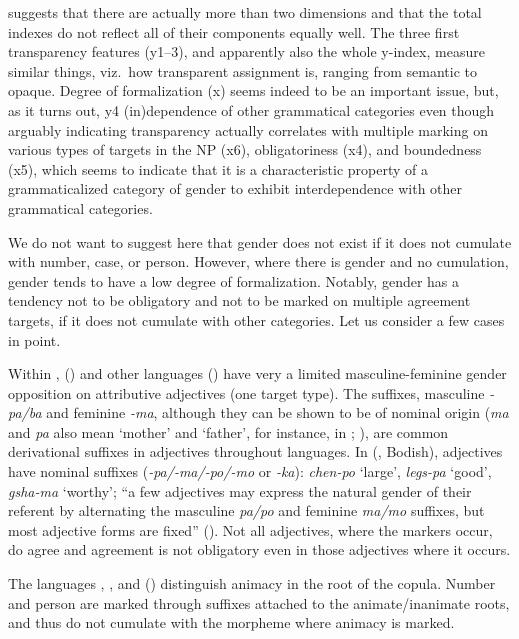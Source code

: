 \documentclass[output=collectionpaper]{langsci/langscibook}
\begin{document}
 suggests that there are actually more than two dimensions and that the total indexes do not reflect all of their components equally well. The three first transparency features (y1--3), and apparently also the whole y-index, measure similar things, viz.\ how transparent assignment is, ranging from semantic to opaque. Degree of formalization (x) seems indeed to be an important issue, but, as it turns out, y4 (in)dependence of other grammatical categories \textendash{} even though arguably indicating transparency \textendash{} actually correlates with multiple marking on various types of targets in the NP (x6), obligatoriness (x4), and boundedness (x5), which seems to indicate that it is a characteristic property of a grammaticalized category of gender to exhibit interdependence with other grammatical categories.

We do not want to suggest here that gender does not exist if it does not cumulate with number, case, or person. However, where there is gender and no cumulation, gender tends to have a low degree of formalization. Notably, gender has a tendency not to be obligatory and not to be marked on multiple agreement targets, if it does not cumulate with other categories. Let us consider a few cases in point.

Within ,  (\citealt[21]{Driem1987}) and other  languages (\citealt[508]{Ebert2003a}) have very a limited masculine-feminine gender opposition on attributive adjectives (one target type). The suffixes, masculine  \textit{-pa/ba} and feminine \textit{-ma}, although they can be shown to be of nominal origin (\textit{ma} and \textit{pa} also mean `mother' and `father', for instance, in ; \citealt[535]{Ebert2003b}), are common derivational suffixes in adjectives throughout  languages. In  (, Bodish), adjectives have nominal suffixes (\mbox{\textit{-pa/}}\mbox{\textit{-ma/}}\mbox{\textit{-po/}}\mbox{\textit{-mo}} or \textit{-ka}): \textit{chen-po} `large', \textit{legs-pa} `good', \textit{gsha-ma} `worthy'; ``a few adjectives may express the natural gender of their referent by alternating the masculine \textit{pa/po} and feminine \textit{ma/mo} suffixes, but most adjective forms are fixed'' (\citealt[373]{DeLancey2003}). Not all adjectives, where the markers occur, do agree and agreement is not obligatory even in those adjectives where it occurs.

The  languages , , and  () distinguish animacy in the root of the copula. Number and person are marked through suffixes attached to the animate/inanimate roots, and thus do not cumulate with the morpheme where animacy is marked.
\end{document}
